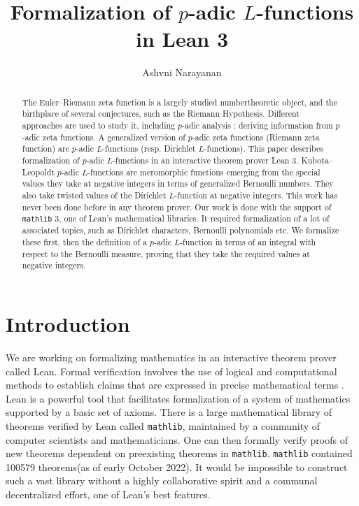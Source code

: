 \documentclass[a4paper,UKenglish,cleveref, autoref, thm-restate,pdfa]{lipics-v2021}
\title{Formalization of $p$-adic $L$-functions in Lean 3} %
\author{Ashvni Narayanan}{London School of Geometry and Number Theory, Imperial College London}{a.narayanan20@imperial.ac.uk}{https://orcid.org/0000-0003-2777-4228}{EPSRC Grant EP/S021590/1 (UK)}%
\newcommand{\lean}[1]{\texttt{#1}\xspace} %
\begin{document}
\maketitle

\begin{abstract}
The Euler--Riemann zeta function is a largely studied numbertheoretic object, and the birthplace of several conjectures, 
such as the Riemann Hypothesis. Different approaches are used to study it, including $p$-adic analysis : 
deriving information from $p$-adic zeta functions. A generalized version of $p$-adic zeta functions (Riemann zeta function) 
are $p$-adic $L$-functions (resp. Dirichlet $L$-functions). This paper describes formalization of $p$-adic $L$-functions 
in an interactive theorem prover Lean 3. Kubota--Leopoldt $p$-adic $L$-functions are meromorphic functions emerging from the 
special values they take at negative integers in terms of generalized Bernoulli numbers. They also take twisted values of 
the Dirichlet $L$-function at negative integers. This work has never been done before in any theorem prover. 
Our work is done with the support of \lean{mathlib} 3, one of Lean's mathematical libraries. It required formalization of a 
lot of associated topics, such as Dirichlet characters, Bernoulli polynomials etc. We formalize these first, 
then the definition of a $p$-adic $L$-function in terms of an integral with respect to the Bernoulli measure, 
proving that they take the required values at negative integers.
\end{abstract}

\section{Introduction}
We are working on formalizing mathematics in an interactive theorem prover called Lean. 
Formal verification involves the use of logical and computational methods to establish 
claims that are expressed in precise mathematical terms \cite{TPIL}. Lean is a powerful tool 
that facilitates formalization of a system of mathematics supported by a basic set of axioms. There is a large mathematical library of theorems verified by Lean called \lean{mathlib}, maintained by a community of computer scientists and mathematicians. One can then 
formally verify proofs of new theorems dependent on preexisting theorems in \lean{mathlib}. 
\lean{mathlib} contained 100579 theorems(as of early October 2022). It would be impossible to construct 
such a vast library without a highly collaborative spirit and a communal decentralized effort, one of 
Lean's best features. 
\end{document}
